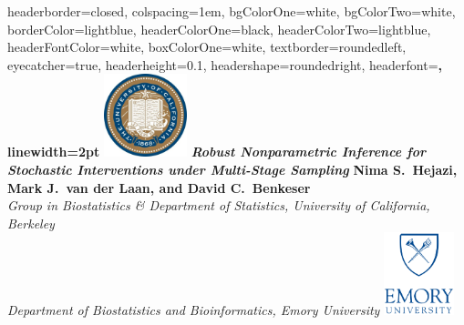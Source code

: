 \documentclass[landscape,a0paper,fontscale=0.285]{baposter} %
\begin{document}
\begin{poster} {
headerborder=closed, %
colspacing=1em, %
bgColorOne=white, %
bgColorTwo=white, %
borderColor=lightblue, %
headerColorOne=black, %
headerColorTwo=lightblue, %
headerFontColor=white, %
boxColorOne=white, %
textborder=roundedleft, %
eyecatcher=true, %
headerheight=0.1\textheight, %
headershape=roundedright, %
headerfont=\Large\bf\textsc, %
linewidth=2pt %
}
%
{\includegraphics[height=6.5em]{logo_berkeley.jpg}} %
{\bf\textit{\LARGE Robust Nonparametric Inference for Stochastic Interventions
    under Multi-Stage Sampling}\vspace{0.01em}} %
{\textbf{Nima S.~Hejazi, Mark J.~van der Laan, and David C.~Benkeser} \\
  \textit{Group in Biostatistics \& Department of Statistics, University of
    California, Berkeley} \\
  \textit{Department of Biostatistics and Bioinformatics, Emory University}}
{\includegraphics[height=6.5em]{logo_emory.jpg}} %


\end{poster}
\end{document}
